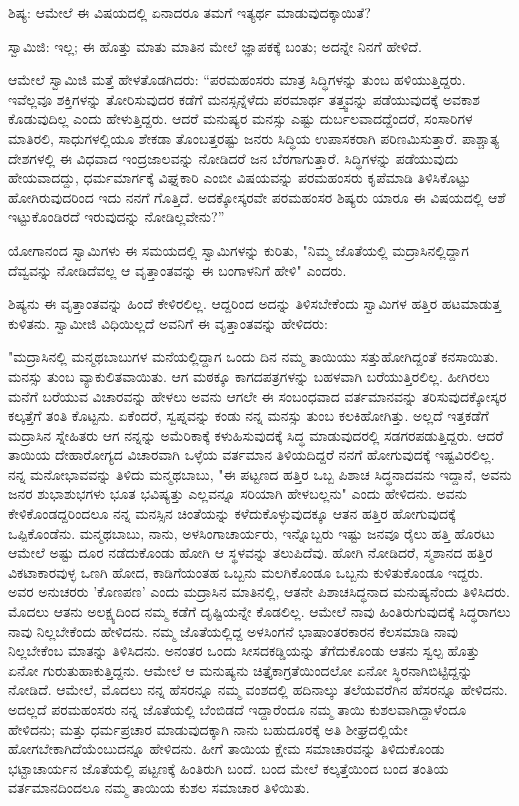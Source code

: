 ಶಿಷ್ಯ: ಆಮೇಲೆ ಈ ವಿಷಯದಲ್ಲಿ ಏನಾದರೂ ತಮಗೆ ಇತ್ಯರ್ಥ ಮಾಡುವುದಕ್ಕಾಯಿತೆ?

ಸ್ವಾಮಿಜಿ: ಇಲ್ಲ; ಈ ಹೊತ್ತು ಮಾತು ಮಾತಿನ ಮೇಲೆ ಜ್ಞಾಪಕಕ್ಕೆ ಬಂತು; ಅದನ್ನೇ ನಿನಗೆ ಹೇಳಿದೆ.

ಆಮೇಲೆ ಸ್ವಾಮಿಜಿ ಮತ್ತೆ ಹೇಳತೊಡಗಿದರು: “ಪರಮಹಂಸರು ಮಾತ್ರ ಸಿದ್ಧಿಗಳನ್ನು ತುಂಬ ಹಳಿಯುತ್ತಿದ್ದರು. ಇವೆಲ್ಲವೂ ಶಕ್ತಿಗಳನ್ನು ತೋರಿಸುವುದರ ಕಡೆಗೆ ಮನಸ್ಸನ್ನೆಳೆದು ಪರಮಾರ್ಥ ತತ್ತ್ವವನ್ನು ಪಡೆಯುವುದಕ್ಕೆ ಅವಕಾಶ ಕೊಡುವುದಿಲ್ಲ ಎಂದು ಹೇಳುತ್ತಿದ್ದರು. ಆದರೆ ಮನುಷ್ಯರ ಮನಸ್ಸು ಎಷ್ಟು ದುರ್ಬಲವಾದದ್ದೆಂದರೆ, ಸಂಸಾರಿಗಳ ಮಾತಿರಲಿ, ಸಾಧುಗಳಲ್ಲಿಯೂ ಶೇಕಡಾ ತೊಂಬತ್ತರಷ್ಟು ಜನರು ಸಿದ್ಧಿಯ ಉಪಾಸಕರಾಗಿ ಪರಿಣಮಿಸುತ್ತಾರೆ. ಪಾಶ್ಚಾತ್ಯ ದೇಶಗಳಲ್ಲಿ ಈ ವಿಧವಾದ ಇಂದ್ರಜಾಲವನ್ನು ನೋಡಿದರೆ ಜನ ಬೆರಗಾಗುತ್ತಾರೆ. ಸಿದ್ಧಿಗಳನ್ನು ಪಡೆಯುವುದು ಹೇಯವಾದದ್ದು, ಧರ್ಮಮಾರ್ಗಕ್ಕೆ ವಿಘ್ನಕಾರಿ ಎಂಬೀ ವಿಷಯವನ್ನು ಪರಮಹಂಸರು ಕೃಪೆಮಾಡಿ ತಿಳಿಸಿಕೊಟ್ಟು ಹೋಗಿರುವುದರಿಂದ ಇದು ನನಗೆ ಗೊತ್ತಿದೆ. ಅದಕ್ಕೋಸ್ಕರವೇ ಪರಮಹಂಸರ ಶಿಷ್ಯರು ಯಾರೂ ಈ ವಿಷಯದಲ್ಲಿ ಆಶೆ ಇಟ್ಟುಕೊಂಡಿರದೆ ಇರುವುದನ್ನು ನೋಡಿಲ್ಲವೇನು?”

ಯೋಗಾನಂದ ಸ್ವಾಮಿಗಳು ಈ ಸಮಯದಲ್ಲಿ ಸ್ವಾಮಿಗಳನ್ನು ಕುರಿತು, "ನಿಮ್ಮ ಜೊತೆಯಲ್ಲಿ ಮದ್ರಾಸಿನಲ್ಲಿದ್ದಾಗ ದೆವ್ವವನ್ನು ನೋಡಿದೆವಲ್ಲ ಆ ವೃತ್ತಾಂತವನ್ನು ಈ ಬಂಗಾಳನಿಗೆ ಹೇಳಿ" ಎಂದರು.

ಶಿಷ್ಯನು ಈ ವೃತ್ತಾಂತವನ್ನು ಹಿಂದೆ ಕೇಳಿರಲಿಲ್ಲ. ಆದ್ದರಿಂದ ಅದನ್ನು ತಿಳಿಸಬೇಕೆಂದು ಸ್ವಾಮಿಗಳ ಹತ್ತಿರ ಹಟಮಾಡುತ್ತ ಕುಳಿತನು. ಸ್ವಾಮೀಜಿ ವಿಧಿಯಿಲ್ಲದೆ ಅವನಿಗೆ ಈ ವೃತ್ತಾಂತವನ್ನು ಹೇಳಿದರು:

"ಮದ್ರಾಸಿನಲ್ಲಿ ಮನ್ಮಥಬಾಬುಗಳ ಮನೆಯಲ್ಲಿದ್ದಾಗ ಒಂದು ದಿನ ನಮ್ಮ ತಾಯಿಯು ಸತ್ತುಹೋಗಿದ್ದಂತೆ ಕನಸಾಯಿತು. ಮನಸ್ಸು ತುಂಬ ವ್ಯಾಕುಲಿತವಾಯಿತು. ಆಗ ಮಠಕ್ಕೂ ಕಾಗದಪತ್ರಗಳನ್ನು ಬಹಳವಾಗಿ ಬರೆಯುತ್ತಿರಲಿಲ್ಲ. ಹೀಗಿರಲು ಮನೆಗೆ ಬರೆಯುವ ವಿಚಾರವನ್ನು ಹೇಳಲು ಅವನು ಆಗಲೇ ಈ ಸಂಬಂಧವಾದ ವರ್ತಮಾನವನ್ನು ತರಿಸುವುದಕ್ಕೋಸ್ಕರ ಕಲ್ಕತ್ತೆಗೆ ತಂತಿ ಕೊಟ್ಟನು. ಏಕೆಂದರೆ, ಸ್ವಪ್ನವನ್ನು ಕಂಡು ನನ್ನ ಮನಸ್ಸು ತುಂಬ ಕಲಕಿಹೋಗಿತ್ತು. ಅಲ್ಲದೆ ಇತ್ತಕಡೆಗೆ ಮದ್ರಾಸಿನ ಸ್ನೇಹಿತರು ಆಗ ನನ್ನನ್ನು ಅಮೆರಿಕಾಕ್ಕೆ ಕಳುಹಿಸುವುದಕ್ಕೆ ಸಿದ್ಧ ಮಾಡುವುದರಲ್ಲಿ ಸಡಗರಪಡುತ್ತಿದ್ದರು. ಆದರೆ ತಾಯಿಯ ದೇಹಾರೋಗ್ಯದ ವಿಚಾರವಾಗಿ ಒಳ್ಳೆಯ ವರ್ತಮಾನ ತಿಳಿಯದಿದ್ದರೆ ನನಗೆ ಹೋಗುವುದಕ್ಕೆ ಇಷ್ಟವಿರಲಿಲ್ಲ. ನನ್ನ ಮನೋಭಾವವನ್ನು ತಿಳಿದು ಮನ್ಮಥಬಾಬು, "ಈ ಪಟ್ಟಣದ ಹತ್ತಿರ ಒಬ್ಬ ಪಿಶಾಚ ಸಿದ್ಧನಾದವನು ಇದ್ದಾನೆ, ಅವನು ಜನರ ಶುಭಾಶುಭಗಳು ಭೂತ ಭವಿಷ್ಯತ್ತು ಎಲ್ಲವನ್ನೂ ಸರಿಯಾಗಿ ಹೇಳಬಲ್ಲನು" ಎಂದು ಹೇಳಿದನು. ಅವನು ಕೇಳಿಕೊಂಡದ್ದರಿಂದಲೂ ನನ್ನ ಮನಸ್ಸಿನ ಚಿಂತೆಯನ್ನು ಕಳೆದುಕೊಳ್ಳುವುದಕ್ಕೂ ಆತನ ಹತ್ತಿರ ಹೋಗುವುದಕ್ಕೆ ಒಪ್ಪಿಕೊಂಡೆನು. ಮನ್ಮಥಬಾಬು, ನಾನು, ಅಳಸಿಂಗಾಚಾರ್ಯರು, ಇನ್ನೊಬ್ಬರು ಇಷ್ಟು ಜನವೂ ರೈಲು ಹತ್ತಿ ಹೊರಟು ಆಮೇಲೆ ಅಷ್ಟು ದೂರ ನಡೆದುಕೊಂಡು ಹೋಗಿ ಆ ಸ್ಥಳವನ್ನು ತಲುಪಿದೆವು. ಹೋಗಿ ನೋಡಿದರೆ, ಸ್ಮಶಾನದ ಹತ್ತಿರ ವಿಕಟಾಕಾರವುಳ್ಳ ಒಣಗಿ ಹೋದ, ಕಾಡಿಗೆಯಂತಹ ಒಬ್ಬನು ಮಲಗಿಕೊಂಡೂ ಒಬ್ಬನು ಕುಳಿತುಕೊಂಡೂ ಇದ್ದರು. ಅವರ ಅನುಚರರು 'ಕೊಣಪಣ' ಎಂದು ಮದ್ರಾಸಿನ ಮಾತಿನಲ್ಲಿ, ಆತನೇ ಪಿಶಾಚಸಿದ್ಧನಾದ ಮನುಷ್ಯನೆಂದು ತಿಳಿಸಿದರು. ಮೊದಲು ಆತನು ಅಲಕ್ಷ್ಯದಿಂದ ನಮ್ಮ ಕಡೆಗೆ ದೃಷ್ಟಿಯನ್ನೇ ಕೊಡಲಿಲ್ಲ. ಆಮೇಲೆ ನಾವು ಹಿಂತಿರುಗುವುದಕ್ಕೆ ಸಿದ್ಧರಾಗಲು ನಾವು ನಿಲ್ಲಬೇಕೆಂದು ಹೇಳಿದನು. ನಮ್ಮ ಜೊತೆಯಲ್ಲಿದ್ದ ಅಳಸಿಂಗನೆ ಭಾಷಾಂತರಕಾರನ ಕೆಲಸಮಾಡಿ ನಾವು ನಿಲ್ಲಬೇಕೆಂಬ ಮಾತನ್ನು ತಿಳಿಸಿದನು. ಅನಂತರ ಒಂದು ಸೀಸದಕಡ್ಡಿಯನ್ನು ತೆಗೆದುಕೊಂಡು ಆತನು ಸ್ವಲ್ಪ ಹೊತ್ತು ಏನೋ ಗುರುತುಹಾಕುತ್ತಿದ್ದನು. ಆಮೇಲೆ ಆ ಮನುಷ್ಯನು ಚಿತ್ತೈಕಾಗ್ರತೆಯಿಂದಲೋ ಏನೋ ಸ್ಥಿರನಾಗಿಬಿಟ್ಟಿದ್ದನ್ನು ನೋಡಿದೆ. ಆಮೇಲೆ, ಮೊದಲು ನನ್ನ ಹೆಸರನ್ನೂ ನಮ್ಮ ವಂಶದಲ್ಲಿ ಹದಿನಾಲ್ಕು ತಲೆಯವರೆಗಿನ ಹೆಸರನ್ನೂ ಹೇಳಿದನು. ಅದಲ್ಲದೆ ಪರಮಹಂಸರು ನನ್ನ ಜೊತೆಯಲ್ಲಿ ಬೆಂಬಿಡದೆ ಇದ್ದಾರೆಂದೂ ನಮ್ಮ ತಾಯಿ ಕುಶಲವಾಗಿದ್ದಾಳೆಂದೂ ಹೇಳಿದನು; ಮತ್ತು ಧರ್ಮಪ್ರಚಾರ ಮಾಡುವುದಕ್ಕಾಗಿ ನಾನು ಬಹುದೂರಕ್ಕೆ ಅತಿ ಶೀಘ್ರದಲ್ಲಿಯೇ ಹೋಗಬೇಕಾಗಿದೆಯೆಂಬುದನ್ನೂ ಹೇಳಿದನು. ಹೀಗೆ ತಾಯಿಯ ಕ್ಷೇಮ ಸಮಾಚಾರವನ್ನು ತಿಳಿದುಕೊಂಡು ಭಟ್ಟಾಚಾರ್ಯನ ಜೊತೆಯಲ್ಲಿ ಪಟ್ಟಣಕ್ಕೆ ಹಿಂತಿರುಗಿ ಬಂದೆ. ಬಂದ ಮೇಲೆ ಕಲ್ಕತ್ತೆಯಿಂದ ಬಂದ ತಂತಿಯ ವರ್ತಮಾನದಿಂದಲೂ ನಮ್ಮ ತಾಯಿಯ ಕುಶಲ ಸಮಾಚಾರ ತಿಳಿಯಿತು.

